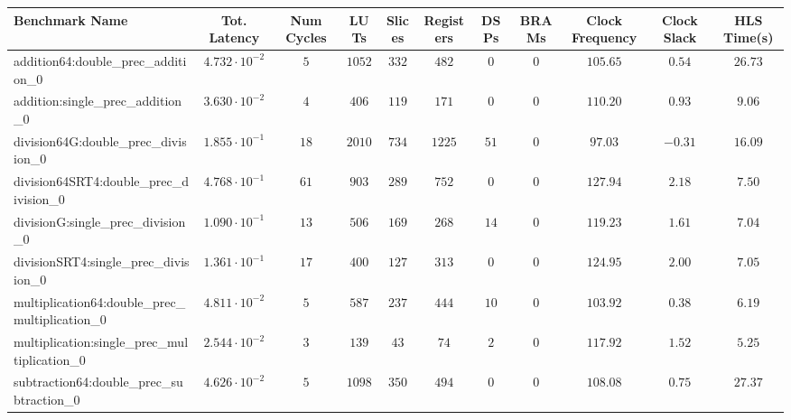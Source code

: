\begin{tabular}{|l|c|c|c|c|c|c|c|c|c|c|}
\hline
Benchmark Name                                   & Tot. Latency            & Num Cycles & LUTs     & Slices   & Registers & DSPs   & BRAMs & Clock Frequency & Clock Slack & HLS Time(s) \\
\hline
addition64:double\_prec\_addition\_0             & $ 4.732 \cdot 10^{-2} $ & $ 5      $ & $ 1052 $ & $ 332  $ & $ 482   $ & $ 0  $ & $ 0 $ & $ 105.65      $ & $ 0.54    $ & $ 26.73   $ \\
addition:single\_prec\_addition\_0               & $ 3.630 \cdot 10^{-2} $ & $ 4      $ & $ 406  $ & $ 119  $ & $ 171   $ & $ 0  $ & $ 0 $ & $ 110.20      $ & $ 0.93    $ & $ 9.06    $ \\
division64G:double\_prec\_division\_0            & $ 1.855 \cdot 10^{-1} $ & $ 18     $ & $ 2010 $ & $ 734  $ & $ 1225  $ & $ 51 $ & $ 0 $ & $ 97.03       $ & $ -0.31   $ & $ 16.09   $ \\
division64SRT4:double\_prec\_division\_0         & $ 4.768 \cdot 10^{-1} $ & $ 61     $ & $ 903  $ & $ 289  $ & $ 752   $ & $ 0  $ & $ 0 $ & $ 127.94      $ & $ 2.18    $ & $ 7.50    $ \\
divisionG:single\_prec\_division\_0              & $ 1.090 \cdot 10^{-1} $ & $ 13     $ & $ 506  $ & $ 169  $ & $ 268   $ & $ 14 $ & $ 0 $ & $ 119.23      $ & $ 1.61    $ & $ 7.04    $ \\
divisionSRT4:single\_prec\_division\_0           & $ 1.361 \cdot 10^{-1} $ & $ 17     $ & $ 400  $ & $ 127  $ & $ 313   $ & $ 0  $ & $ 0 $ & $ 124.95      $ & $ 2.00    $ & $ 7.05    $ \\
multiplication64:double\_prec\_multiplication\_0 & $ 4.811 \cdot 10^{-2} $ & $ 5      $ & $ 587  $ & $ 237  $ & $ 444   $ & $ 10 $ & $ 0 $ & $ 103.92      $ & $ 0.38    $ & $ 6.19    $ \\
multiplication:single\_prec\_multiplication\_0   & $ 2.544 \cdot 10^{-2} $ & $ 3      $ & $ 139  $ & $ 43   $ & $ 74    $ & $ 2  $ & $ 0 $ & $ 117.92      $ & $ 1.52    $ & $ 5.25    $ \\
subtraction64:double\_prec\_subtraction\_0       & $ 4.626 \cdot 10^{-2} $ & $ 5      $ & $ 1098 $ & $ 350  $ & $ 494   $ & $ 0  $ & $ 0 $ & $ 108.08      $ & $ 0.75    $ & $ 27.37   $ \\

\end{tabular}
